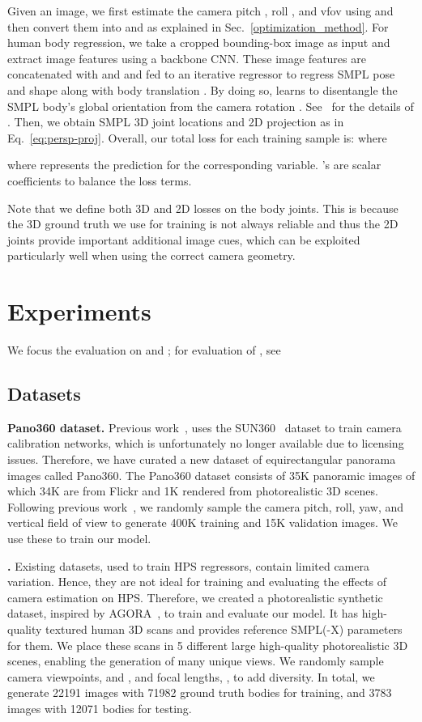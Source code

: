 \documentclass[10pt,twocolumn,letterpaper,usenames,dvipsnames]{article}
\begin{document}
Given an image, we first estimate the camera pitch , roll , and vfov  using \camcalib and then convert them into  and  as explained in Sec.~\ref{optimization_method}. For human body regression, we take a cropped bounding-box image as input and extract image features using a backbone CNN. 
These image features are concatenated with  and  and fed to an iterative regressor \cite{kanazawa_hmr} 
to regress SMPL pose  and shape  along with body translation . 
By doing so, \methodname learns to disentangle the SMPL body's global orientation  from the camera rotation . See \supmat~for the details of .
Then, we obtain SMPL 3D joint locations  and 2D projection  as in Eq.~\ref{eq:persp-proj}.
Overall, our total loss for each training sample is:
 where 

where  represents the prediction for the corresponding variable. 's are scalar coefficients to balance the loss terms. 

Note that we define both 3D and 2D losses on the body joints.
This is because the 3D ground truth we use for training is not always reliable and thus the 2D joints provide important additional image cues, 
which can be exploited particularly well when using the correct camera geometry.
 \section{Experiments}
\label{experiments}
We focus the evaluation on \camcalib and \methodname; for evaluation of \smplify, see \supmat

\subsection{Datasets}

\textbf{Pano360 dataset.} Previous work~\cite{Hold-Geoffroy_2018_CVPR, zhu2020single}, uses the SUN360~\cite{xiao2012recognizing} dataset to train camera calibration networks, which is unfortunately no longer available due to licensing issues. Therefore, we have curated a new dataset of equirectangular panorama images called Pano360. The Pano360 dataset consists of 35K panoramic images of which 34K are from Flickr and 1K rendered from photorealistic 3D scenes. Following previous work~\cite{Hold-Geoffroy_2018_CVPR, zhu2020single}, we randomly sample the camera pitch, roll, yaw, and vertical field of view to generate 400K training and 15K validation images. We use these to train our \camcalib model. 

\textbf{\agoracam.} Existing datasets, used to train HPS regressors, contain limited camera variation. Hence, they are not ideal for training and evaluating the effects of camera estimation on HPS. 
Therefore, we created a photorealistic synthetic dataset, inspired by AGORA~\cite{patel2021agora}, to train and evaluate our model. 
It has high-quality textured human 3D scans and provides reference SMPL(-X) parameters for them. 
We place these scans in 5 different large high-quality photorealistic 3D scenes, enabling the generation of many unique views. 
We randomly sample camera viewpoints,  and , and focal lengths, , to add diversity.
In total, we generate 22191 images with 71982 ground truth bodies for training, and 3783 images with 12071 bodies for testing. 
\end{document}
